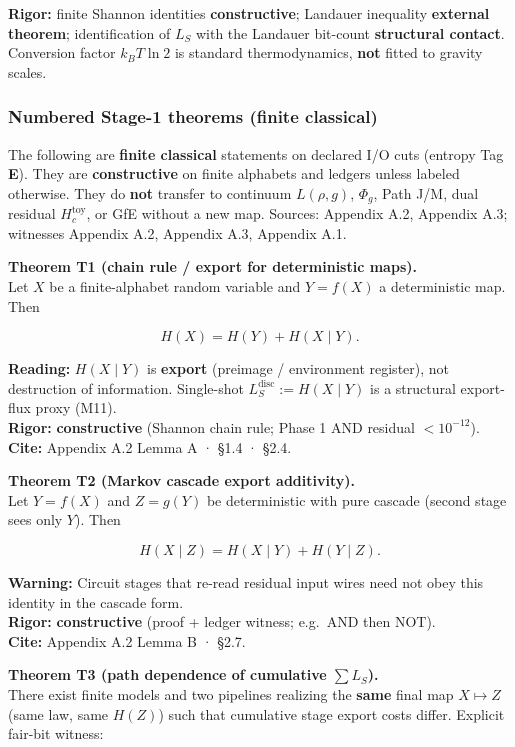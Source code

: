 \documentclass[
  11pt,
]{article}
\begin{document}
\textbf{Rigor:} finite Shannon identities \textbf{constructive};
Landauer inequality \textbf{external theorem}; identification of \(L_S\)
with the Landauer bit-count \textbf{structural contact}. Conversion
factor \(k_B T\ln 2\) is standard thermodynamics, \textbf{not} fitted to
gravity scales.

\subsubsection{Numbered Stage-1 theorems (finite
classical)}\label{numbered-stage-1-theorems-finite-classical}

The following are \textbf{finite classical} statements on declared I/O
cuts (entropy Tag \textbf{E}). They are \textbf{constructive} on finite
alphabets and ledgers unless labeled otherwise. They do \textbf{not}
transfer to continuum \(L(\rho,g)\), \(\Phi_g\), Path J/M, dual residual
\(H_c^{\mathrm{toy}}\), or GfE without a new map. Sources: Appendix A.2,
Appendix A.3; witnesses Appendix A.2, Appendix A.3, Appendix A.1.

\textbf{Theorem T1 (chain rule / export for deterministic maps).}\\
Let \(X\) be a finite-alphabet random variable and \(Y=f(X)\) a
deterministic map. Then

\[
H(X)=H(Y)+H(X\mid Y).
\]

\textbf{Reading:} \(H(X\mid Y)\) is \textbf{export} (preimage /
environment register), not destruction of information. Single-shot
\(L_S^{\mathrm{disc}}:=H(X\mid Y)\) is a structural export-flux proxy
(M11).\\
\textbf{Rigor:} \textbf{constructive} (Shannon chain rule; Phase 1 AND
residual \(<10^{-12}\)).\\
\textbf{Cite:} Appendix A.2 Lemma A · §1.4 · §2.4.

\textbf{Theorem T2 (Markov cascade export additivity).}\\
Let \(Y=f(X)\) and \(Z=g(Y)\) be deterministic with pure cascade (second
stage sees only \(Y\)). Then

\[
H(X\mid Z)=H(X\mid Y)+H(Y\mid Z).
\]

\textbf{Warning:} Circuit stages that re-read residual input wires need
not obey this identity in the cascade form.\\
\textbf{Rigor:} \textbf{constructive} (proof + ledger witness; e.g.~AND
then NOT).\\
\textbf{Cite:} Appendix A.2 Lemma B · §2.7.

\textbf{Theorem T3 (path dependence of cumulative \(\sum L_S\)).}\\
There exist finite models and two pipelines realizing the \textbf{same}
final map \(X\mapsto Z\) (same law, same \(H(Z)\)) such that cumulative
stage export costs differ. Explicit fair-bit witness:
\end{document}
